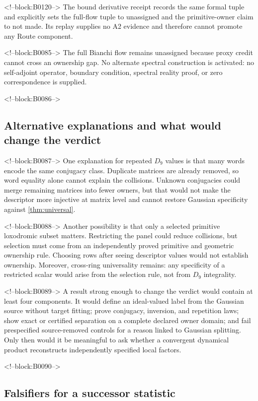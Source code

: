 \documentclass[11pt,a4paper]{article}
\theoremstyle{definition}
\theoremstyle{remark}
\begin{document}
<!--block:B0120-->
The bound derivative receipt records the same formal tuple and explicitly sets the full-flow tuple to unassigned and the primitive-owner claim to not made. Its replay supplies no A2 evidence and therefore cannot promote any Route component.

<!--block:B0085-->
The full Bianchi flow remains unassigned because proxy credit cannot cross an ownership gap. No alternate spectral construction is activated: no self-adjoint operator, boundary condition, spectral reality proof, or zero correspondence is supplied.

<!--block:B0086-->
\subsection{Alternative explanations and what would change the verdict}

<!--block:B0087-->
One explanation for repeated \(D_9\) values is that many words encode the same conjugacy class. Duplicate matrices are already removed, so word equality alone cannot explain the collisions. Unknown conjugacies could merge remaining matrices into fewer owners, but that would not make the descriptor more injective at matrix level and cannot restore Gaussian specificity against \cref{thm:universal}.

<!--block:B0088-->
Another possibility is that only a selected primitive loxodromic subset matters. Restricting the panel could reduce collisions, but selection must come from an independently proved primitive and geometric ownership rule. Choosing rows after seeing descriptor values would not establish ownership. Moreover, cross-ring universality remains: any specificity of a restricted scalar would arise from the selection rule, not from \(D_9\) integrality.

<!--block:B0089-->
A result strong enough to change the verdict would contain at least four components. It would define an ideal-valued label from the Gaussian source without target fitting; prove conjugacy, inversion, and repetition laws; show exact or certified separation on a complete declared owner domain; and fail prespecified source-removed controls for a reason linked to Gaussian splitting. Only then would it be meaningful to ask whether a convergent dynamical product reconstructs independently specified local factors.

<!--block:B0090-->
\subsection{Falsifiers for a successor statistic}
\end{document}
